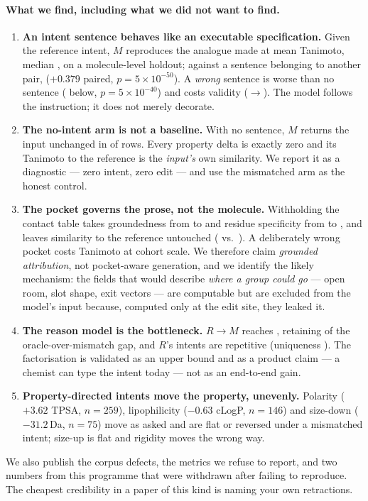 \paragraph{What we find, including what we did not want to find.}
\begin{enumerate}\itemsep2pt
\item \textbf{An intent sentence behaves like an executable specification.} Given the reference
intent, $M$ reproduces the analogue made at  mean Tanimoto, median , on a
molecule-level holdout; against a sentence belonging to another pair,  ($+0.379$ paired,
$p=5\times10^{-50}$). A \emph{wrong} sentence is worse than no sentence ( below,
$p=5\times10^{-40}$) and costs validity ($\rightarrow$). The model follows the
instruction; it does not merely decorate.
\item \textbf{The no-intent arm is not a baseline.} With no sentence, $M$ returns the input
unchanged in  of rows. Every property delta is exactly zero and its Tanimoto to the
reference is the \emph{input's} own similarity. We report it as a diagnostic --- zero intent, zero
edit --- and use the mismatched arm as the honest control.
\item \textbf{The pocket governs the prose, not the molecule.} Withholding the contact table takes
groundedness from  to  and residue specificity from  to , and
leaves similarity to the reference untouched ( vs.\ ). A deliberately wrong pocket
costs  Tanimoto at cohort scale. We therefore claim \emph{grounded attribution}, not
pocket-aware generation, and we identify the likely mechanism: the fields that would describe
\emph{where a group could go} --- open room, slot shape, exit vectors --- are computable but are
excluded from the model's input because, computed only at the edit site, they leaked it.
\item \textbf{The reason model is the bottleneck.} $R\!\rightarrow\!M$ reaches , retaining
 of the oracle-over-mismatch gap, and $R$'s intents are repetitive (uniqueness ).
The factorisation is validated as an upper bound and as a product claim --- a chemist can type the
intent today --- not as an end-to-end gain.
\item \textbf{Property-directed intents move the property, unevenly.} Polarity ($+3.62$ TPSA,
$n=259$), lipophilicity ($-0.63$ cLogP, $n=146$) and size-down ($-31.2$\,Da, $n=75$) move as asked
and are flat or reversed under a mismatched intent; size-up is flat and rigidity moves the wrong
way.
\end{enumerate}

We also publish the corpus defects, the metrics we refuse to report, and two numbers from this
programme that were withdrawn after failing to reproduce. The cheapest credibility in a paper of
this kind is naming your own retractions.
